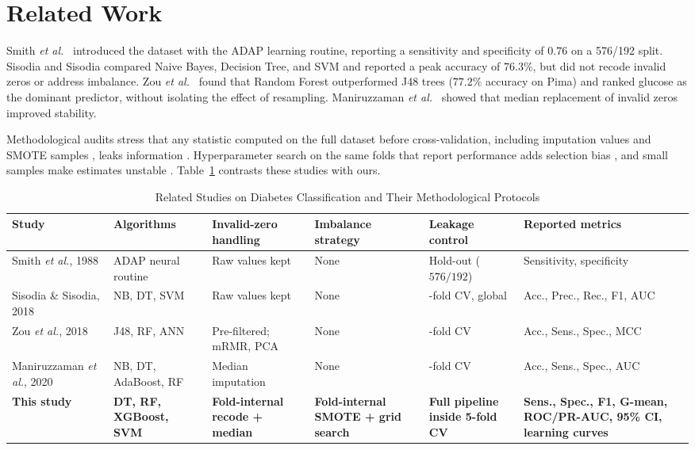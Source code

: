 \documentclass[journal]{IEEEtran}
\begin{document}
\section{Related Work}\label{sec:related}
Smith \emph{et al.}\ \cite{smith1988using} introduced the dataset with the ADAP learning routine, reporting a sensitivity and specificity of $0.76$ on a 576/192 split. Sisodia and Sisodia \cite{sisodia2018prediction} compared Naive Bayes, Decision Tree, and SVM and reported a peak accuracy of $76.3\%$, but did not recode invalid zeros or address imbalance. Zou \emph{et al.}\ \cite{zou2018predicting} found that Random Forest outperformed J48 trees ($77.2\%$ accuracy on Pima) and ranked glucose as the dominant predictor, without isolating the effect of resampling. Maniruzzaman \emph{et al.}\ \cite{maniruzzaman2020classification} showed that median replacement of invalid zeros improved stability.

Methodological audits stress that any statistic computed on the full dataset before cross-validation, including imputation values and SMOTE samples \cite{chawla2002smote}, leaks information \cite{kaufman2012leakage,kapoor2023leakage}. Hyperparameter search on the same folds that report performance adds selection bias \cite{cawley2010overfitting}, and small samples make estimates unstable \cite{vabalas2019validation}. Table~\ref{tab:related_work} contrasts these studies with ours.

\begin{table}[t]
\centering
\caption{Related Studies on Diabetes Classification and Their Methodological Protocols}
\label{tab:related_work}
\footnotesize
\begin{tabular}{>{\raggedright\arraybackslash}p{2.9cm}>{\raggedright\arraybackslash}p{3.2cm}>{\raggedright\arraybackslash}p{2.6cm}>{\raggedright\arraybackslash}p{2.0cm}>{\raggedright\arraybackslash}p{2.6cm}>{\raggedright\arraybackslash}p{3.4cm}}
\toprule
\textbf{Study} & \textbf{Algorithms} & \textbf{Invalid-zero handling} & \textbf{Imbalance strategy} & \textbf{Leakage control} & \textbf{Reported metrics} \\
\midrule
Smith \emph{et al.}, 1988 \cite{smith1988using} & ADAP neural routine & Raw values kept & None & Hold-out ($576/192$) & Sensitivity, specificity \\
Sisodia \& Sisodia, 2018 \cite{sisodia2018prediction} & NB, DT, SVM & Raw values kept & None & 10-fold CV, global & Acc., Prec., Rec., F1, AUC \\
Zou \emph{et al.}, 2018 \cite{zou2018predicting} & J48, RF, ANN & Pre-filtered; mRMR, PCA & None & 5-fold CV & Acc., Sens., Spec., MCC \\
Maniruzzaman \emph{et al.}, 2020 \cite{maniruzzaman2020classification} & NB, DT, AdaBoost, RF & Median imputation & None & 10-fold CV & Acc., Sens., Spec., AUC \\
\textbf{This study} & \textbf{DT, RF, XGBoost, SVM} & \textbf{Fold-internal recode + median} & \textbf{Fold-internal SMOTE + grid search} & \textbf{Full pipeline inside 5-fold CV} & \textbf{Sens., Spec., F1, G-mean, ROC/PR-AUC, 95\% CI, learning curves} \\
\bottomrule
\end{tabular}
\end{table}
\end{document}
